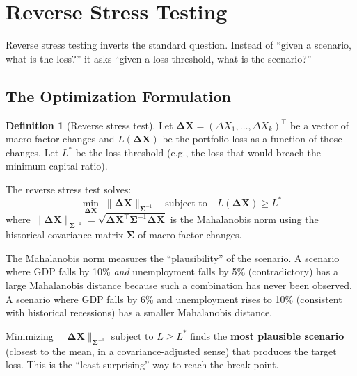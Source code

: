 \documentclass[11pt, a4paper]{article}
\theoremstyle{definition}
\newtheorem{definition}{Definition}[section]
\theoremstyle{plain}
\theoremstyle{remark}
\begin{document}
\section{Reverse Stress Testing}
\label{sec:reverse}

Reverse stress testing inverts the standard question.
Instead of ``given a scenario, what is the loss?''
it asks ``given a loss threshold, what is the scenario?''

\subsection{The Optimization Formulation}

\begin{definition}[Reverse stress test]
Let $\bm{\Delta X} = (\Delta X_1, \ldots, \Delta X_k)^\top$ be a vector of macro factor changes
and $L(\bm{\Delta X})$ be the portfolio loss as a function of those changes.
Let $L^*$ be the loss threshold (e.g., the loss that would breach the minimum capital ratio).

The reverse stress test solves:
\[
    \min_{\bm{\Delta X}} \; \|\bm{\Delta X}\|_{\bm{\Sigma}^{-1}}
    \quad \text{subject to} \quad L(\bm{\Delta X}) \geq L^*
\]
where $\|\bm{\Delta X}\|_{\bm{\Sigma}^{-1}} = \sqrt{\bm{\Delta X}^\top \bm{\Sigma}^{-1} \bm{\Delta X}}$
is the Mahalanobis norm using the historical covariance matrix $\bm{\Sigma}$ of macro factor changes.
\end{definition}

\begin{keyidea}
The Mahalanobis norm measures the ``plausibility'' of the scenario.
A scenario where GDP falls by 10\% \emph{and} unemployment falls by 5\%
(contradictory) has a large Mahalanobis distance because such a combination
has never been observed.
A scenario where GDP falls by 6\% and unemployment rises to 10\%
(consistent with historical recessions) has a smaller Mahalanobis distance.

\medskip

Minimizing $\|\bm{\Delta X}\|_{\bm{\Sigma}^{-1}}$ subject to $L \geq L^*$
finds the \textbf{most plausible scenario} (closest to the mean, in a covariance-adjusted sense)
that produces the target loss.
This is the ``least surprising'' way to reach the break point.
\end{keyidea}
\end{document}
